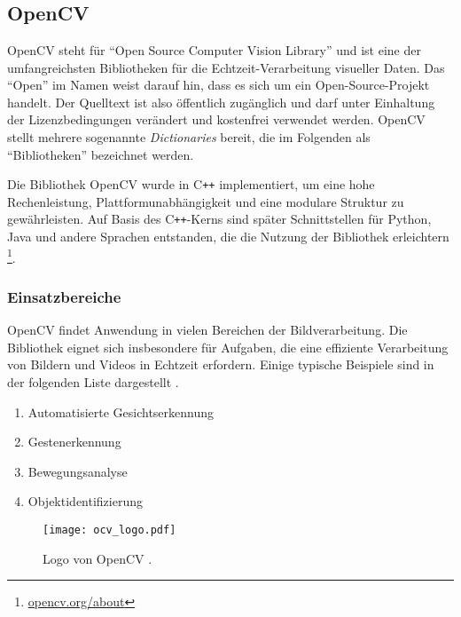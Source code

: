 \chapter{\chapTwo}
\label{cha:chapter2} %

\begingroup
\fontsize{12pt}{14pt}\selectfont

\section{OpenCV}
\label{sec:ocv} %
OpenCV steht für \enquote{Open Source Computer Vision Library} und ist eine der umfangreichsten Bibliotheken für die Echtzeit-Verarbeitung visueller Daten.
Das \enquote{Open} im Namen weist darauf hin, dass es sich um ein Open-Source-Projekt handelt.
Der Quelltext ist also öffentlich zugänglich und darf unter Einhaltung der Lizenzbedingungen verändert und kostenfrei verwendet werden.
OpenCV stellt mehrere sogenannte \textit{Dictionaries} bereit, die im Folgenden als \enquote{Bibliotheken} bezeichnet werden.

Die Bibliothek OpenCV wurde in C\texttt{++} implementiert, um eine hohe Rechenleistung, Plattformunabhängigkeit und eine modulare Struktur zu gewährleisten.
Auf Basis des C\texttt{++}-Kerns sind später Schnittstellen für Python, Java und andere Sprachen entstanden, die die Nutzung der Bibliothek erleichtern \cite{ocv:org}\footnote{\url{opencv.org/about}}.

\subsection{Einsatzbereiche}
OpenCV findet Anwendung in vielen Bereichen der Bildverarbeitung.
Die Bibliothek eignet sich insbesondere für Aufgaben, die eine effiziente Verarbeitung von Bildern und Videos in Echtzeit erfordern.
Einige typische Beispiele sind in der folgenden Liste dargestellt \cite{Wiki:ocv}.

\begin{minipage}{0.55\textwidth}
    \begin{enumerate}
        \item Automatisierte Gesichtserkennung
        \item Gestenerkennung
        \item Bewegungsanalyse
        \item Objektidentifizierung
    \end{enumerate}
\end{minipage}
\hfill
\begin{minipage}{0.4\textwidth}
    \begin{figure}[H]
        \centering
            \texttt{[image: ocv\_logo.pdf]}
        \caption{Logo von OpenCV \cite{ocv:org}.}
            \label{pic:ocv_logo}
    \end{figure}
\end{minipage}

